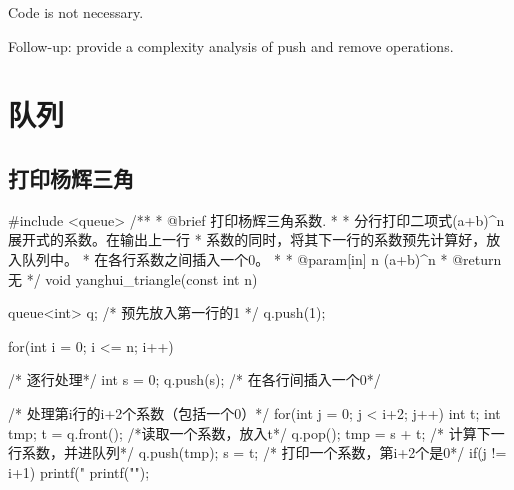 Code is not necessary. 

Follow-up: provide a complexity analysis of push and remove operations.

\section{队列} %


\subsection{打印杨辉三角}

\begin{Codex}[label=yanghui_triangle.cpp]
#include <queue>
/**
 * @brief 打印杨辉三角系数.
 *
 * 分行打印二项式(a+b)^n展开式的系数。在输出上一行
 * 系数的同时，将其下一行的系数预先计算好，放入队列中。
 * 在各行系数之间插入一个0。
 *
 * @param[in] n (a+b)^n
 * @return 无
 */
void yanghui_triangle(const int n) {
    queue<int> q;
    /* 预先放入第一行的1 */
    q.push(1);

    for(int i = 0; i <= n; i++) {     /* 逐行处理*/
        int s = 0;
        q.push(s);      /* 在各行间插入一个0*/

        /* 处理第i行的i+2个系数（包括一个0）*/
        for(int j = 0; j < i+2; j++) {
            int t;
            int tmp;
            t = q.front();  /*读取一个系数，放入t*/
            q.pop();
            tmp = s + t;      /* 计算下一行系数，并进队列*/
            q.push(tmp);
            s = t;            /* 打印一个系数，第i+2个是0*/
            if(j != i+1) {
                printf("%
            }
        }
        printf("\n");
    }
}
\end{Codex}
